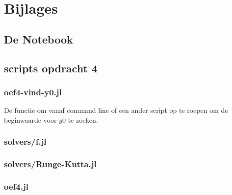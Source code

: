 \documentclass[12pt, a4paper]{article}
\theoremstyle{definition}
\begin{document}
\newpage
\section{Bijlages}
\subsection{De Notebook}


\newpage
\subsection{scripts opdracht 4}

\subsubsection{oef4-vind-y0.jl}
De functie om vanaf command line of een ander script op te roepen om de beginwaarde voor $y0$ te zoeken.


\subsubsection{solvers/f.jl}


\subsubsection{solvers/Runge-Kutta.jl}


\subsubsection{oef4.jl}

\end{document}
